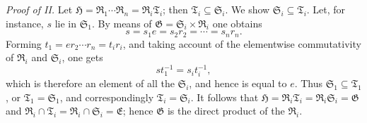 \documentclass[11pt]{article}
\providecommand{\mG}{\mathfrak{G}}
\providecommand{\mE}{\mathfrak{E}}
\providecommand{\mH}{\mathfrak{H}}
\providecommand{\mR}{\mathfrak{R}}
\providecommand{\mS}{\mathfrak{S}}
\providecommand{\mT}{\mathfrak{T}}
\begin{document}
\emph{Proof of II.} Let $\mH=\mR_1\cdots\mR_n=\mR_i\mT_i$; then $\mT_i\subseteq\mS_i$. We show $\mS_i\subseteq\mT_i$. Let, for instance, $s$ lie in $\mS_1$. By means of $\mG=\mS_i\times\mR_i$ one obtains
\[
        s=s_1e=s_2r_2=\cdots=s_nr_n.
\]
Forming $t_1=er_2\cdots r_n=t_ir_i$, and taking account of the elementwise commutativity of $\mR_i$ and $\mS_i$, one gets
\[
        st_1^{-1}=s_it_i^{-1},
\]
which is therefore an element of all the $\mS_i$, and hence is equal to $e$. Thus $\mS_1\subseteq\mT_1$, or $\mT_1=\mS_1$, and correspondingly $\mT_i=\mS_i$. It follows that $\mH=\mR_i\mT_i=\mR_i\mS_i=\mG$ and $\mR_i\cap\mT_i=\mR_i\cap\mS_i=\mE$; hence $\mG$ is the direct product of the $\mR_i$.
\end{document}
